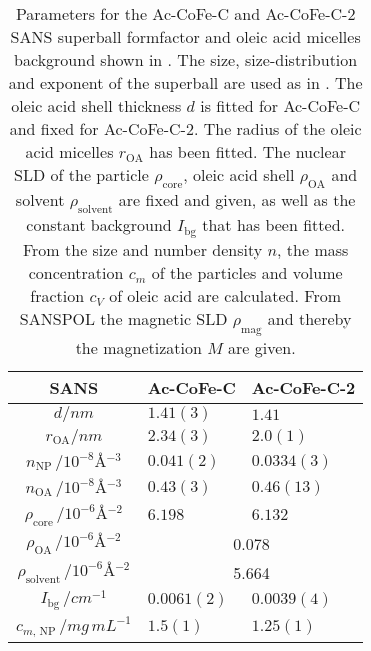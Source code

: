 \documentclass[\main/dresen_thesis.tex]{subfiles}
\begin{document}
    \begin{table}[!htbp]
      \centering
      \caption{\label{tab:monolayers:nanoparticle:sans:superballAcAcFit}Parameters for the Ac-CoFe-C and Ac-CoFe-C-2 SANS superball formfactor and oleic acid micelles background shown in .
      The size, size-distribution and exponent of the superball are used as in .
      The oleic acid shell thickness $d$ is fitted for Ac-CoFe-C and fixed for Ac-CoFe-C-2.
      The radius of the oleic acid micelles $r_\mathrm{OA}$ has been fitted.
      The nuclear SLD of the particle $\rho_\mathrm{core}$, oleic acid shell $\rho_\mathrm{OA}$ and solvent $\rho_\mathrm{solvent}$ are fixed and given, as well as the constant background $I_\mathrm{bg}$ that has been fitted.
      From the size and number density $n$, the mass concentration $c_m$ of the particles and volume fraction $c_V$ of oleic acid are calculated. From SANSPOL the magnetic SLD $\rho_\mathrm{mag}$ and thereby the magnetization $M$ are given.}
      \begin{tabular}{ c | l | l }
        \textbf{SANS}  & \textbf{Ac-CoFe-C} & \textbf{Ac-CoFe-C-2}\\
        \hline
        \rule{0pt}{2ex} $d / \unit{nm}$                                       & $1.41(3)$      & $1.41$  \\
        \rule{0pt}{2ex} $r_\mathrm{OA} / \unit{nm}$                           & $2.34(3)$      & $2.0(1)$  \\
        \rule{0pt}{2ex} $n_\mathrm{NP} \, / \unit{10^{-8} \angstrom^{-3}}$    & $0.041(2)$     & $0.0334(3)$ \\
        \rule{0pt}{2ex} $n_\mathrm{OA} \, / \unit{10^{-8} \angstrom^{-3}}$    & $0.43(3)$      & $0.46(13)$  \\
        \hline
        \rule{0pt}{2ex} $\rho_\mathrm{core}    \, / \unit{10^{-6} \angstrom^{-2}}$   & $6.198$        & $6.132$    \\
        \hline
        \rule{0pt}{2ex} $\rho_\mathrm{OA}      \, / \unit{10^{-6} \angstrom^{-2}}$   & \multicolumn{2}{c}{0.078}\\
        \rule{0pt}{2ex} $\rho_\mathrm{solvent} \, / \unit{10^{-6} \angstrom^{-2}}$   & \multicolumn{2}{c}{5.664}\\
        \hline
        \rule{0pt}{2ex} $I_\mathrm{bg} \, / \unit{cm^{-1}}$                          & $0.0061(2)$    & $0.0039(4)$\\
        \hline
        \rule{0pt}{2ex} $c_{m, \, \mathrm{NP}} \, / \unit{mg\, mL^{-1}}$             & $1.5(1)$       & $1.25(1)$  \\

\end{tabular}
\end{table}
\end{document}
